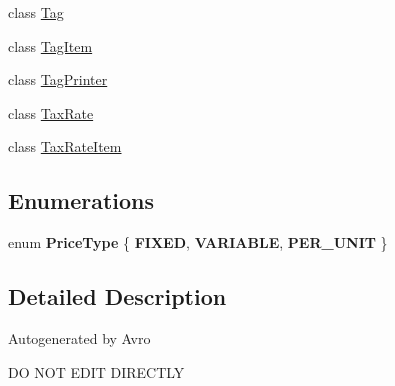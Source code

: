 \begin{DoxyCompactItemize}
class \hyperlink{classcom_1_1clover_1_1sdk_1_1v3_1_1inventory_1_1_tag}{Tag}
\item 
class \hyperlink{classcom_1_1clover_1_1sdk_1_1v3_1_1inventory_1_1_tag_item}{Tag\+Item}
\item 
class \hyperlink{classcom_1_1clover_1_1sdk_1_1v3_1_1inventory_1_1_tag_printer}{Tag\+Printer}
\item 
class \hyperlink{classcom_1_1clover_1_1sdk_1_1v3_1_1inventory_1_1_tax_rate}{Tax\+Rate}
\item 
class \hyperlink{classcom_1_1clover_1_1sdk_1_1v3_1_1inventory_1_1_tax_rate_item}{Tax\+Rate\+Item}
\end{DoxyCompactItemize}
\subsection*{Enumerations}
\begin{DoxyCompactItemize}
\item 
\mbox{\label{namespacecom_1_1clover_1_1sdk_1_1v3_1_1inventory_a29563083c5ea6797e6ce5b3f5a1d2f12}} 
enum {\bfseries Price\+Type} \{ {\bfseries F\+I\+X\+ED}, 
{\bfseries V\+A\+R\+I\+A\+B\+LE}, 
{\bfseries P\+E\+R\+\_\+\+U\+N\+IT}
 \}
\end{DoxyCompactItemize}


\subsection{Detailed Description}
Autogenerated by Avro

DO N\+OT E\+D\+IT D\+I\+R\+E\+C\+T\+LY 